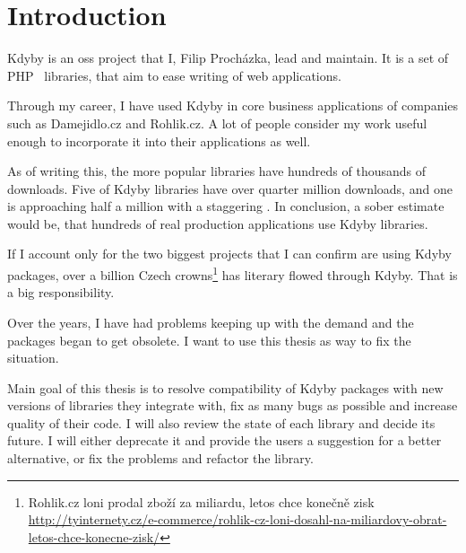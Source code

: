 \chapter{Introduction}

Kdyby is an \gls{oss} project that I, Fi\-li\-p P\-ro\-chá\-z\-ka, lead and maintain. It is a set of PHP~\cite{php:manual:about} libraries, that aim to ease writing of web applications.

Through my career, I have used Kdyby in core business applications of companies such as Damejidlo.cz and Rohlik.cz. A lot of people consider my work useful enough to incorporate it into their applications as well.

As of writing this, the more popular libraries have hundreds of thousands of downloads. Five of Kdyby libraries have over quarter million downloads, and one is approaching half a million with a staggering . In conclusion, a sober estimate would be, that hundreds of real production applications use Kdyby libraries.

If I account only for the two biggest projects that I can confirm are using Kdyby packages, over a billion Czech crowns\footnote{Rohlik.cz loni prodal zboží za miliardu, letos chce konečně zisk \\\url{http://tyinternety.cz/e-commerce/rohlik-cz-loni-dosahl-na-miliardovy-obrat-letos-chce-konecne-zisk/}} has literary flowed through Kdyby. That is a big responsibility.

Over the years, I have had problems keeping up with the demand and the packages began to get obsolete. I want to use this thesis as way to fix the situation.

Main goal of this thesis is to resolve compatibility of Kdyby packages with new versions of libraries they integrate with, fix as many bugs as possible and increase quality of their code. I will also review the state of each library and decide its future. I will either deprecate it and provide the users a suggestion for a better alternative, or fix the problems and refactor the library.
